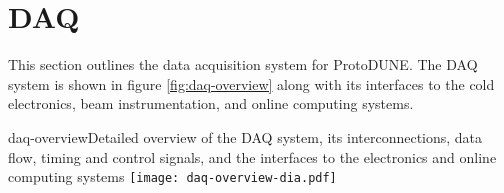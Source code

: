 \section{DAQ} \label{sec:daq}

This section outlines the data acquisition system for ProtoDUNE.
The DAQ system is shown in figure \ref{fig:daq-overview} along with its
interfaces to the cold electronics, beam instrumentation, and online
computing systems.


\begin{cdrfigure}{daq-overview}{Detailed overview of the
DAQ system, its interconnections, data flow, timing and control signals,
and the interfaces to the electronics and online computing systems}
        \texttt{[image: daq-overview-dia.pdf]}
\end{cdrfigure}







